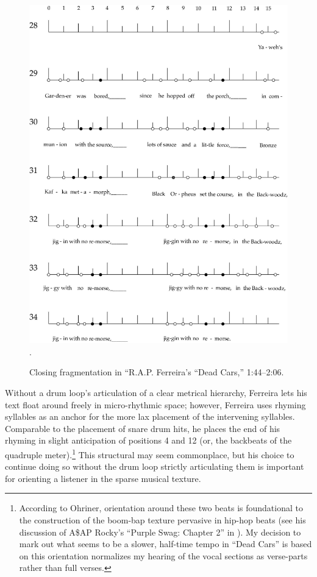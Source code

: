     \begin{figure}[!htp]
        \centering
        \includegraphics{images/figures/chp 03/144206deadcarsendfrag.pdf}
        .\caption{Closing fragmentation in ``R.A.P. Ferreira's ``Dead Cars,'' 1:44--2:06.}
        \label{fig:roryclosingfrag}
    \end{figure}

Without a drum loop's articulation of a clear metrical hierarchy, Ferreira lets his text float around freely
in micro-rhythmic space; however, Ferreira uses rhyming syllables as an anchor for the more lax placement of
the intervening syllables. Comparable to the placement of snare drum hits, he places the end of his rhyming
in slight anticipation of positions 4 and 12 (or, the backbeats of the quadruple meter).\footnote{
    According to Ohriner, orientation around these two beats is foundational to the construction of the
    boom-bap texture pervasive in hip-hop beats (see his discussion of A\$AP Rocky's ``Purple Swag: 
    Chapter 2'' in \autocite[18]{mitchellohrinerFlowRhythmicVoice2019}). My decision to mark out what seems
    to be a slower, half-time tempo in ``Dead Cars'' is based on this orientation normalizes my hearing of
    the vocal sections as verse-parts rather than full verses.}
This structural may seem commonplace, but his choice to continue doing so without the drum loop strictly 
articulating them is important for orienting a listener in the sparse musical texture.

